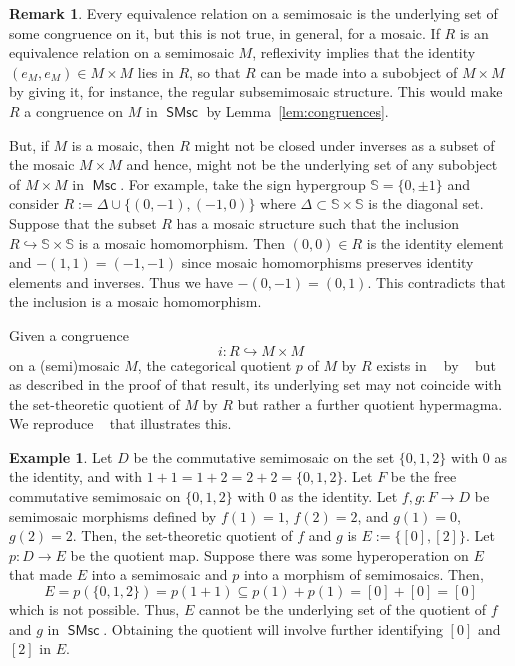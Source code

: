 \documentclass[reqno]{amsart}
\newcommand{\cat}[1]{\ensuremath{\mathsf{#1}}}
\DeclareMathOperator{\Msc}{\cat{Msc}}
\DeclareMathOperator{\SMsc}{\cat{SMsc}}
\DeclareMathOperator{\sMsc}{\cat{(S)Msc}}
\numberwithin{equation}{section}
\theoremstyle{plain}
\theoremstyle{definition}
\newtheorem{example}[equation]{Example}
\newtheorem{remark}[equation]{Remark}
\begin{document}
\begin{remark}
    Every equivalence relation on a semimosaic is the underlying set of some congruence on it, but this is not true, in general, for a mosaic. If $R$ is an equivalence relation on a semimosaic $M$, reflexivity implies that the identity $(e_M, e_M) \in M \times M$ lies in $R$, so that $R$ can be made into a subobject of $M\times M$ by giving it, for instance, the regular subsemimosaic structure. This would make $R$ a congruence on $M$ in $\SMsc$ by Lemma~\ref{lem:congruences}. 
    
    But, if $M$ is a mosaic, then $R$ might not be closed under inverses as a subset of the mosaic $M\times M$ and hence, might not be the underlying set of any subobject of $M\times M$ in $\Msc$. 
For example, take the sign hypergroup $\mathbb{S}=\{0, \pm1\}$ and consider $R:=\Delta\cup\{(0, -1), (-1, 0)\}$ where $\Delta\subset\mathbb{S}\times\mathbb{S}$ is the diagonal set. Suppose that the subset $R$ has a mosaic structure such that the inclusion $R\hookrightarrow\mathbb{S}\times\mathbb{S}$ is a mosaic homomorphism. Then $(0,0) \in R$ is the identity element and $-(1, 1)=(-1, -1)$ since mosaic homomorphisms preserves identity elements and inverses. Thus we have $-(0, -1)=(0, 1)$. This contradicts that the inclusion is a mosaic homomorphism. 
\end{remark}



  Given a congruence \[
 i \colon R \hookrightarrow M \times M
 \]
 on a (semi)mosaic
$M$, the categorical quotient $p$ of $M$ by $R$ exists in $\sMsc$ by ~\cite[Theorem~3.11]{NakamuraReyes} but as described in the proof of that result, its underlying set may not coincide with the set-theoretic quotient of $M$ by $R$ but rather a further quotient hypermagma. We reproduce ~\cite[Example~3.6]{NakamuraReyes} that illustrates this.

\begin{example}
     Let $D$ be the commutative semimosaic on the set $\{0, 1, 2\}$ with $0$ as the identity, and with $1+1=1+2=2+2=\{0, 1, 2\}$. Let $F$ be the free commutative semimosaic on $\{0, 1, 2\}$ with 0 as the identity. Let $f,g:F\to D$ be semimosaic morphisms defined by $f(1)=1$, $f(2)=2$, and $g(1)=0$, $g(2)=2$. Then, the set-theoretic quotient of $f$ and $g$ is $E:=\{[0], [2]\}$. Let $p:D\to E$ be the quotient map. Suppose there was some hyperoperation on $E$ that made $E$ into a semimosaic and $p$ into a morphism of semimosaics. Then, 
    $$E = p(\{0, 1, 2\})=p(1+1)\subseteq p(1)+p(1) = [0]+[0] = [0]$$
    which is not possible. Thus, $E$ cannot be the underlying set of the quotient of $f$ and $g$ in $\SMsc$. Obtaining the quotient will involve further identifying $[0]$ and $[2]$ in $E$.
\end{example}
\end{document}
